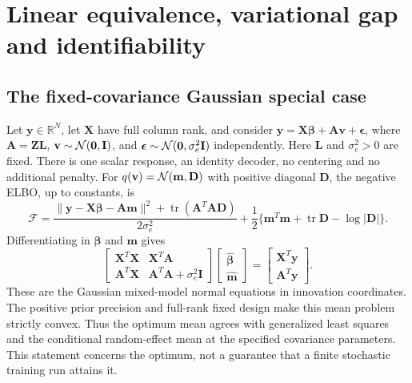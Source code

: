 \appendix
\section{Linear equivalence, variational gap and identifiability}
\label{app:linear}

\subsection{The fixed-covariance Gaussian special case}
Let $\mathbf y\in\mathbb R^N$, let $\mathbf X$ have full column rank, and consider
$\mathbf y=\mathbf X\boldsymbol\beta+\mathbf A\mathbf v+\boldsymbol\epsilon$,
where $\mathbf A=\mathbf Z\mathbf L$, $\mathbf v\sim\mathcal{N}(\mathbf0,\mathbf I)$,
and $\boldsymbol\epsilon\sim\mathcal{N}(\mathbf0,\sigma_e^2\mathbf I)$ independently.
Here $\mathbf L$ and $\sigma_e^2>0$ are fixed. There is one scalar response,
an identity decoder, no centering and no additional penalty. For
$q(\mathbf v)=\mathcal{N}(\mathbf m,\mathbf D)$ with positive diagonal $\mathbf D$,
the negative ELBO, up to constants, is
\begin{equation}
 \mathcal F=\frac{\|\mathbf y-\mathbf X\boldsymbol\beta-\mathbf A\mathbf m\|^2
             +\operatorname{tr}(\mathbf A^T\mathbf A\mathbf D)}{2\sigma_e^2}
       +\frac12\{\mathbf m^T\mathbf m+\operatorname{tr}\mathbf D-\log|\mathbf D|\}.
\end{equation}
Differentiating in $\boldsymbol\beta$ and $\mathbf m$ gives
\begin{equation}
 \begin{bmatrix}
 \mathbf X^T\mathbf X & \mathbf X^T\mathbf A\\
 \mathbf A^T\mathbf X & \mathbf A^T\mathbf A+\sigma_e^2\mathbf I
 \end{bmatrix}
 \begin{bmatrix}\widehat{\boldsymbol\beta}\\\widehat{\mathbf m}\end{bmatrix}
 =\begin{bmatrix}\mathbf X^T\mathbf y\\\mathbf A^T\mathbf y\end{bmatrix}.
\end{equation}
These are the Gaussian mixed-model normal equations in innovation coordinates.
The positive prior precision and full-rank fixed design make this mean problem
strictly convex. Thus the optimum mean agrees with generalized least squares
and the conditional random-effect mean at the specified covariance parameters.
This statement concerns the optimum, not a guarantee that a finite stochastic
training run attains it.

